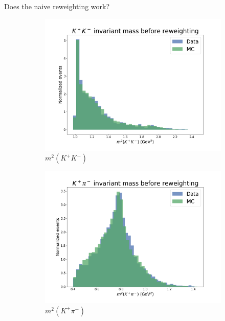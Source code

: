 \documentclass{beamer}
\begin{document}
\begin{frame}{Does the naive reweighting work?}
  \begin{figure}
    \begin{subfigure}{0.33\textwidth}
      \includegraphics[width = 1.0\textwidth]{Plots/s01_DataMCMismatch_BeforeReweighting.png}
      \caption{$m^2(K^+K^-)$}
    \end{subfigure}%
    \begin{subfigure}{0.33\textwidth}
      \includegraphics[width = 1.0\textwidth]{Plots/s03_DataMCMismatch_BeforeReweighting.png}
      \caption{$m^2(K^+\pi^-)$}
    \end{subfigure}%
    \begin{subfigure}{0.33\textwidth}

\end{subfigure}
\end{figure}
\end{frame}
\end{document}
